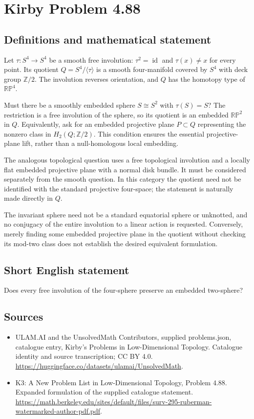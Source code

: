 \documentclass[11pt,a4paper]{article}
\begin{document}
\section*{Kirby Problem 4.88}\label{statement}

\subsection{Definitions and mathematical statement}
Let $\tau:S^4\to S^4$ be a smooth free involution: $\tau^2=\operatorname{id}$ and $\tau(x)\ne x$ for every point. Its quotient $Q=S^4/\langle\tau\rangle$ is a smooth four-manifold covered by $S^4$ with deck group $\mathbb Z/2$. The involution reverses orientation, and $Q$ has the homotopy type of $\mathbb{RP}^4$.

Must there be a smoothly embedded sphere $S\cong S^2$ with $\tau(S)=S$? The restriction is a free involution of the sphere, so its quotient is an embedded $\mathbb{RP}^2$ in $Q$. Equivalently, ask for an embedded projective plane $P\subset Q$ representing the nonzero class in $H_2(Q;\mathbb Z/2)$. This condition ensures the essential projective-plane lift, rather than a null-homologous local embedding.

The analogous topological question uses a free topological involution and a locally flat embedded projective plane with a normal disk bundle. It must be considered separately from the smooth question. In this category the quotient need not be identified with the standard projective four-space; the statement is naturally made directly in $Q$.

The invariant sphere need not be a standard equatorial sphere or unknotted, and no conjugacy of the entire involution to a linear action is requested. Conversely, merely finding some embedded projective plane in the quotient without checking its mod-two class does not establish the desired equivalent formulation.
\subsection{Short English statement}
Does every free involution of the four-sphere preserve an embedded two-sphere?
\subsection{Sources}
\begin{itemize}
\item[S1] ULAM.AI and the UnsolvedMath Contributors, supplied problems.json, catalogue entry, Kirby's Problems in Low-Dimensional Topology. Catalogue identity and source transcription; CC BY 4.0.
\url{https://huggingface.co/datasets/ulamai/UnsolvedMath}.
\item[S2] K3: A New Problem List in Low-Dimensional Topology, Problem 4.88. Expanded formulation of the supplied catalogue statement.
\url{https://math.berkeley.edu/sites/default/files/surv-295-ruberman-watermarked-author-pdf.pdf}.
\end{itemize}
\end{document}
